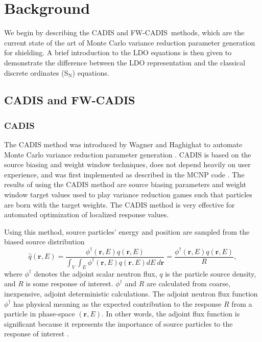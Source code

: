 \documentclass{article} %
\newcommand{\vecr}{\textbf{r}}
\newcommand{\sn}{S$_\mathrm{N}$}
\newcommand{\qhat}{\ensuremath{\hat{q}}}
\newcommand{\fwc}{\mbox{FW-CADIS}}
\begin{document}
\section{Background}
\label{sec:background}

We begin by describing the CADIS and \fwc\ methods, which are the current
state of the art of Monte Carlo variance reduction parameter generation for
shielding. A brief introduction to the LDO equations is then given to
demonstrate the difference between the LDO representation and the classical
discrete ordinates (\sn) equations.

\subsection{CADIS and \fwc}

\subsubsection{CADIS}

The CADIS method was introduced by Wagner and Haghighat to automate Monte
Carlo variance reduction parameter generation \cite{cadis}. CADIS is based on
the source biasing and weight window techniques, does not depend heavily on
user experience, and was first implemented as described 
in the MCNP code \cite{cadis}. The results of using the CADIS method are
source biasing parameters and weight window target values used to play
variance reduction games such that particles are born with the target weights.
The CADIS method is very effective for automated optimization of localized
response values.

Using this method, source particles' energy and position are sampled from the
biased source distribution
%
\begin{equation}
\qhat(\vecr,E) = 
\frac{\phi^{\dagger}(\vecr,E)q(\vecr,E)}
{\int_V\int_E\phi^{\dagger}(\vecr,E)q(\vecr,E) dE\ d\vecr} 
= \frac{\phi^{\dagger}(\vecr,E)q(\vecr,E)}{R},
\label{eq:cadis_sb}
\end{equation}
%
where $\phi^{\dagger}$ denotes the adjoint scalar neutron flux, $q$ is the
particle source density, and $R$ is some response of interest.
$\phi^{\dagger}$ and $R$ are calculated from coarse, inexpensive, adjoint
deterministic calculations. The adjoint neutron flux function $\phi^{\dagger}$
has physical meaning as the expected contribution to the response $R$ from a
particle in phase-space $(\vecr,E)$. In other words, the adjoint flux
function is significant because it represents the importance of source
particles to the response of interest \cite{bg}.
\end{document}
